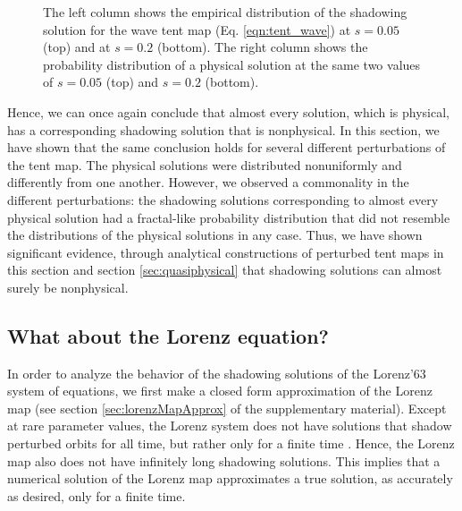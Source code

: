 \begin{figure}
    \caption{The left column shows the empirical distribution of the shadowing solution for the wave tent map (Eq. \ref{eqn:tent_wave}) at $s=0.05$ (top) and at $s=0.2$ (bottom). The right column shows the probability distribution of a physical solution at the same two values of $s = 0.05$ (top) and $s = 0.2$ (bottom).}
    \label{fig:tent_wave_shadow}
\end{figure}
Hence, we can once again conclude that almost every solution, which is physical, 
has a corresponding shadowing solution that is nonphysical. In this section,
we have shown that the same conclusion holds for several different perturbations 
of the tent map. The physical solutions were distributed nonuniformly 
and differently from one another. However, we observed a commonality in the different perturbations: the shadowing solutions corresponding to almost every physical solution had a fractal-like probability distribution that did not resemble the distributions of the physical solutions in any case. Thus, we have shown significant evidence, through analytical constructions of perturbed tent maps in this section and 
section \ref{sec:quasiphysical} that shadowing solutions can almost surely be nonphysical.

\subsection{What about the Lorenz equation?}
In order to analyze the behavior of the shadowing solutions of the Lorenz'63 system 
of equations, we first make a closed form approximation of the Lorenz map (see section \ref{sec:lorenzMapApprox} of the supplementary material). Except at rare parameter values, the Lorenz system does not have 
solutions that shadow perturbed orbits for all time, but rather only for a finite time 
\cite{lorenzPOTP}. Hence, the Lorenz map also does not have infinitely long shadowing solutions. This implies that a numerical solution of the Lorenz map approximates 
a true solution, as accurately as desired, only for a finite time.

